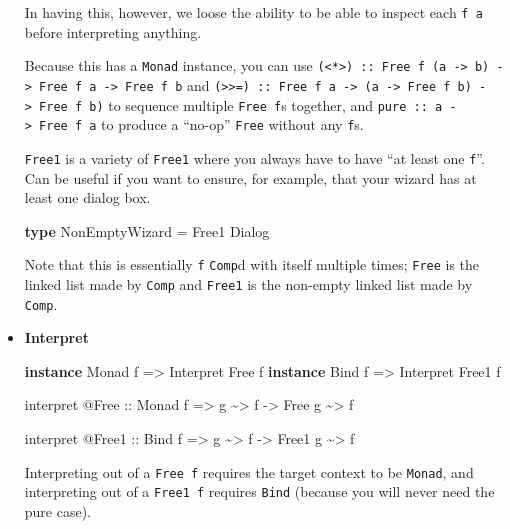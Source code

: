 \documentclass[]{article}
\newenvironment{Shaded}{}{}
\newcommand{\DataTypeTok}[1]{\textcolor[rgb]{0.56,0.13,0.00}{#1}}
\newcommand{\KeywordTok}[1]{\textcolor[rgb]{0.00,0.44,0.13}{\textbf{#1}}}
\newcommand{\NormalTok}[1]{#1}
\newcommand{\OperatorTok}[1]{\textcolor[rgb]{0.40,0.40,0.40}{#1}}
\newcommand{\OtherTok}[1]{\textcolor[rgb]{0.00,0.44,0.13}{#1}}
\begin{document}
\begin{itemize}
  In having this, however, we loose the ability to be able to inspect each
  \texttt{f\ a} before interpreting anything.

  Because this has a \texttt{Monad} instance, you can use
  \texttt{(\textless{}*\textgreater{})\ ::\ Free\ f\ (a\ -\textgreater{}\ b)\ -\textgreater{}\ Free\ f\ a\ -\textgreater{}\ Free\ f\ b}
  and
  \texttt{(\textgreater{}\textgreater{}=)\ ::\ Free\ f\ a\ -\textgreater{}\ (a\ -\textgreater{}\ Free\ f\ b)\ -\textgreater{}\ Free\ f\ b)}
  to sequence multiple \texttt{Free\ f}s together, and
  \texttt{pure\ ::\ a\ -\textgreater{}\ Free\ f\ a} to produce a ``no-op''
  \texttt{Free} without any \texttt{f}s.

  \texttt{Free1} is a variety of \texttt{Free1} where you always have to have
  ``at least one \texttt{f}''. Can be useful if you want to ensure, for example,
  that your wizard has at least one dialog box.

\begin{Shaded}
\begin{Highlighting}[]
\KeywordTok{type} \DataTypeTok{NonEmptyWizard} \OtherTok{=} \DataTypeTok{Free1} \DataTypeTok{Dialog}
\end{Highlighting}
\end{Shaded}

  Note that this is essentially \texttt{f} \texttt{Comp}d with itself multiple
  times; \texttt{Free} is the linked list made by \texttt{Comp} and
  \texttt{Free1} is the non-empty linked list made by \texttt{Comp}.
\item
  \textbf{Interpret}

\begin{Shaded}
\begin{Highlighting}[]
\KeywordTok{instance} \DataTypeTok{Monad}\NormalTok{ f }\OtherTok{=>} \DataTypeTok{Interpret} \DataTypeTok{Free}\NormalTok{  f}
\KeywordTok{instance} \DataTypeTok{Bind}\NormalTok{  f }\OtherTok{=>} \DataTypeTok{Interpret} \DataTypeTok{Free1}\NormalTok{ f}

\NormalTok{interpret }\OperatorTok{@}\DataTypeTok{Free}
\OtherTok{    ::} \DataTypeTok{Monad}\NormalTok{ f}
    \OtherTok{=>}\NormalTok{ g }\OperatorTok{\textasciitilde{}>}\NormalTok{ f}
    \OtherTok{{-}>} \DataTypeTok{Free}\NormalTok{ g }\OperatorTok{\textasciitilde{}>}\NormalTok{ f}

\NormalTok{interpret }\OperatorTok{@}\DataTypeTok{Free1}
\OtherTok{    ::} \DataTypeTok{Bind}\NormalTok{ f}
    \OtherTok{=>}\NormalTok{ g }\OperatorTok{\textasciitilde{}>}\NormalTok{ f}
    \OtherTok{{-}>} \DataTypeTok{Free1}\NormalTok{ g }\OperatorTok{\textasciitilde{}>}\NormalTok{ f}
\end{Highlighting}
\end{Shaded}

  Interpreting out of a \texttt{Free\ f} requires the target context to be
  \texttt{Monad}, and interpreting out of a \texttt{Free1\ f} requires
  \texttt{Bind} (because you will never need the pure case).
\end{itemize}
\end{document}
